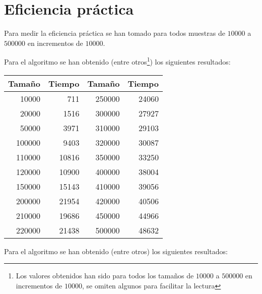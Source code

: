 \pagebreak

\section{Eficiencia práctica}\label{eficiencia-practica}

Para medir la eficiencia práctica se han tomado para todos muestras de $10000$ a $500000$ en incrementos de $10000$.

Para el algoritmo  se han obtenido (entre otros\footnote{Los valores obtenidos han sido para todos los tamaños de $10000$ a $500000$ en incrementos de $10000$, se omiten algunos para facilitar la lectura}) los siguientes resultados:

\begin{center}
\begin{tabular}{r r || r r}
\textbf{Tamaño} & \textbf{Tiempo} & \textbf{Tamaño} & \textbf{Tiempo} \\
\toprule
10000           & 711             & 250000          & 24060           \\
20000           & 1516            & 300000          & 27927           \\
50000           & 3971            & 310000          & 29103           \\
100000          & 9403            & 320000          & 30087           \\
110000          & 10816           & 350000          & 33250           \\
120000          & 10900           & 400000          & 38004           \\
150000          & 15143           & 410000          & 39056           \\
200000          & 21954           & 420000          & 40506           \\
210000          & 19686           & 450000          & 44966           \\
220000          & 21438           & 500000          & 48632           \\
\end{tabular}
\end{center}

Para el algoritmo  se han obtenido (entre otros) los siguientes resultados:

